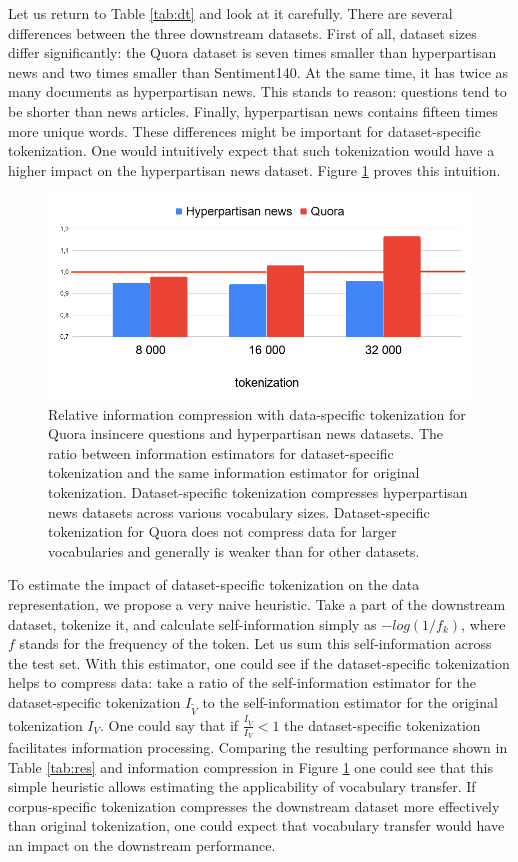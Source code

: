 \documentclass[review]{elsarticle}
\begin{document}
 Let us return to Table \ref{tab:dt} and look at it carefully. There are several differences between the three downstream datasets. First of all, dataset sizes differ significantly: the Quora dataset is seven times smaller than hyperpartisan news and two times smaller than Sentiment140. At the same time, it has twice as many documents as hyperpartisan news. This stands to reason: questions tend to be shorter than news articles. Finally, hyperpartisan news contains fifteen times more unique words. These differences might be important for dataset-specific tokenization. One would intuitively expect that such tokenization would have a higher impact on the hyperpartisan news dataset. Figure \ref{fig:comp} proves this intuition.
 
 \begin{figure}[h]
 \centering
     \includegraphics[scale=0.36]{chart2.png}
  \caption{Relative information compression with data-specific tokenization for Quora insincere questions and hyperpartisan news datasets. The ratio between information estimators for dataset-specific tokenization and the same information estimator for original tokenization. Dataset-specific tokenization compresses hyperpartisan news datasets across various vocabulary sizes. Dataset-specific tokenization for Quora does not compress data for larger vocabularies and generally is weaker than for other datasets.}
  \label{fig:comp}
\end{figure}

To estimate the impact of dataset-specific tokenization on the data representation, we propose a very naive heuristic. Take a part of the downstream dataset, tokenize it, and calculate self-information simply as $-log(1/f_k)$, where $f$ stands for the frequency of the token. Let us sum this self-information across the test set. With this estimator, one could see if the dataset-specific tokenization helps to compress data: take a ratio of the self-information estimator for the dataset-specific tokenization $I_{\widetilde{V}}$ to the self-information estimator for the original tokenization $I_{V}$. One could say that if $\frac{I_{\widetilde{V}}}{I_{V}} < 1$ the dataset-specific tokenization facilitates information processing. Comparing the resulting performance shown in Table \ref{tab:res} and information compression in Figure \ref{fig:comp} one could see that this simple heuristic allows estimating the applicability of vocabulary transfer. If corpus-specific tokenization compresses the downstream dataset more effectively than original tokenization, one could expect that vocabulary transfer would have an impact on the downstream performance. 
\end{document}
